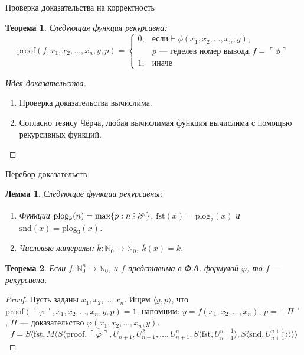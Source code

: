 \documentclass[aspectratio=169]{beamer}
\newtheorem{thm}{Теорема}[section]
\newtheorem{lmm}{Лемма}[section]
\newcommand{\divisible}%
{\mathrel{\lower.2ex%
\vbox{\baselineskip=0.7ex\lineskiplimit=0pt%
\kern6pt \hbox{.}\hbox{.}\hbox{.}}%
}}
\begin{document}
\begin{frame}{Проверка доказательства на корректность}
\begin{thm}Следующая функция рекурсивна:
$$\text{proof}(f,x_1,x_2,\dots,x_n,y,p) = \left\{\begin{array}{ll} 
0, & \mbox{если} \vdash\phi(\overline{x_1},\overline{x_2},\dots,\overline{x_n},\overline{y}),\\
   & p \mbox{ --- гёделев номер вывода}, f = \ulcorner\phi\urcorner \\ 
1, & \mbox{иначе}
\end{array}\right.$$\vspace{-0.1cm}\pause
\end{thm}
\begin{proof}[Идея доказательства]
\begin{enumerate}
\item Проверка доказательства вычислима.\pause
\item Согласно тезису Чёрча, любая вычислимая функция
вычислима с помощью рекурсивных функций.
\end{enumerate}
\end{proof}
\end{frame}

\begin{frame}{Перебор доказательств}
\begin{lmm}Следующие функции рекурсивны:
\begin{enumerate}
\item Функции $\text{plog}_k(n) = \max\{p: n \divisible k^p\}$, $\text{fst}(x) = \text{plog}_2(x)$ и $\text{snd}(x) = \text{plog}_3(x)$.\pause
\item Числовые литералы: $\overline{k}: \mathbb{N}_0 \rightarrow \mathbb{N}_0$, $\overline{k}(x) = k$.\pause
\end{enumerate}
\end{lmm}
\begin{thm}Если $f: \mathbb{N}^n_0\rightarrow\mathbb{N}_0$, и $f$ представима в Ф.А. формулой $\varphi$, то $f$ --- рекурсивна.
\end{thm}\pause
\begin{proof}
Пусть заданы $x_1,x_2,\dots,x_n$. Ищем $\langle y, p\rangle$, 
что $\text{proof}(\ulcorner\varphi\urcorner,x_1,x_2,\dots,x_n,y,p)=1$, \pause
напомним: $y = f(x_1,x_2,\dots,x_n)$, $p = \ulcorner\Pi\urcorner$,
$\Pi$ --- доказательство $\varphi(\overline{x_1},\overline{x_2},\dots,\overline{x_n},\overline{y})$. \pause
$$f = S \langle \text{fst}, M\langle S \langle \text{proof}, \overline{\ulcorner\varphi\urcorner}, U^1_{n+1}, U^2_{n+1}, \dots, U^n_{n+1}, 
  S \langle \text{fst},U^{n+1}_{n+1}\rangle, S\langle \text{snd}, U^{n+1}_{n+1}\rangle \rangle \rangle \rangle$$
\end{proof}
\end{frame}
\end{document}

